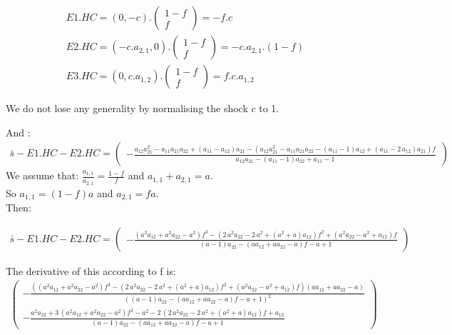 \documentclass[11pt,a4paper]{article} %
\begin{document}
\begin{gather*}
E1.HC = \left(0,-c\right).\left(\begin{matrix}1-f\\f\end{matrix}\right)=-f.c
\\
E2.HC=\left(-c.a_{2,1},0\right).\left(\begin{matrix}1-f\\f\end{matrix}\right)=-c.a_{2,1}.\left(1-f\right)
\\ 
E3.HC=\left(0,c.a_{1,2}\right).\left(\begin{matrix}1-f\\f\end{matrix}\right)=f.c.a_{1,2}
\end{gather*}

We do not lose any generality by normalising the shock $c$ to 1. 

And :
\begin{gather}
\bar{s}-E1.HC-E2.HC=\left(\begin{array}{r}
-\frac{a_{12} a_{21}^{2} - a_{11} a_{21} a_{22} + {\left(a_{11} - a_{12}\right)} a_{21} - {\left(a_{12} a_{21}^{2} - a_{11} a_{21} a_{22} - {\left(a_{11} - 1\right)} a_{12} + {\left(a_{11} - 2 \, a_{12}\right)} a_{21}\right)} f}{a_{12} a_{21} - {\left(a_{11} - 1\right)} a_{22} + a_{11} - 1}
\end{array}\right)
\end{gather}
We assume that:
$\frac{a_{1,1}}{a_{2,1}}=\frac{1-f}{f}$ and $a_{1,1}+a_{2,1}=a$. \\ 
So
$a_{1,1}=(1-f)a$ and $a_{2,1}=fa$. \\

Then:

\begin{gather}
\bar{s}-E1.HC-E2.HC=\left(\begin{array}{r}
-\frac{{\left(a^{2} a_{12} + a^{2} a_{22} - a^{2}\right)} f^{3} - {\left(2 \, a^{2} a_{22} - 2 \, a^{2} + {\left(a^{2} + a\right)} a_{12}\right)} f^{2} + {\left(a^{2} a_{22} - a^{2} + a_{12}\right)} f}{{\left(a - 1\right)} a_{22} - {\left(a a_{12} + a a_{22} - a\right)} f - a + 1}
\end{array}\right)
\end{gather}

The derivative of this according to f is: 
\begin{gather*}
\left(\begin{array}{r}
-\frac{{\left({\left(a^{2} a_{12} + a^{2} a_{22} - a^{2}\right)} f^{3} - {\left(2 \, a^{2} a_{22} - 2 \, a^{2} + {\left(a^{2} + a\right)} a_{12}\right)} f^{2} + {\left(a^{2} a_{22} - a^{2} + a_{12}\right)} f\right)} {\left(a a_{12} + a a_{22} - a\right)}}{{\left({\left(a - 1\right)} a_{22} - {\left(a a_{12} + a a_{22} - a\right)} f - a + 1\right)}^{2}} \\
- \frac{a^{2} a_{22} + 3 \, {\left(a^{2} a_{12} + a^{2} a_{22} - a^{2}\right)} f^{2} - a^{2} - 2 \, {\left(2 \, a^{2} a_{22} - 2 \, a^{2} + {\left(a^{2} + a\right)} a_{12}\right)} f + a_{12}}{{\left(a - 1\right)} a_{22} - {\left(a a_{12} + a a_{22} - a\right)} f - a + 1}
\end{array}\right)
\end{gather*}
\end{document}
